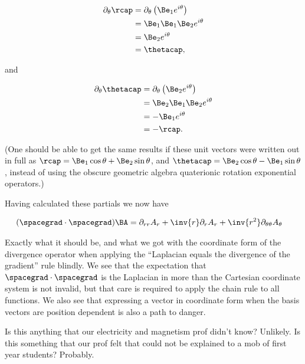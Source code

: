 \begin{align*}
\partial_\theta \rcap 
&=
\partial_\theta \left( \Be_1 e^{i\theta} \right) \\
&=
\Be_1 \Be_1 \Be_2 e^{i\theta} \\
&=
\Be_2 e^{i\theta} \\
&=
\thetacap,
\end{align*}

and

\begin{align*}
\partial_\theta \thetacap 
&=
\partial_\theta \left( \Be_2 e^{i\theta} \right) \\
&=
\Be_2 \Be_1 \Be_2 e^{i\theta} \\
&=
-\Be_1 e^{i\theta} \\
&=
-\rcap.
\end{align*}

(One should be able to get the same results if these unit vectors were written out in full as $\rcap = \Be_1 \cos\theta + \Be_2 \sin\theta$, and $\thetacap = \Be_2 \cos\theta - \Be_1 \sin\theta$, instead of using the obscure geometric algebra quaterionic rotation exponential operators.)

Having calculated these partials we now have

\begin{align}\label{eqn:divGradCurLap:14}
(\spacegrad \cdot \spacegrad) \BA
&=
\partial_{rr} A_r
+\inv{r} \partial_r A_r
+\inv{r^2} \partial_{\theta\theta} A_\theta
\end{align}

Exactly what it should be, and what we got with the coordinate form of the divergence operator when applying the ``Laplacian equals the divergence of the gradient'' rule blindly.  We see that the expectation that $\spacegrad \cdot \spacegrad$ is the Laplacian in more than the Cartesian coordinate system is not invalid, but that care is required to apply the chain rule to all functions.  We also see that expressing a vector in coordinate form when the basis vectors are position dependent is also a path to danger.

Is this anything that our electricity and magnetism prof didn't know?  Unlikely.  Is this something that our prof felt that could not be explained to a mob of first year students?  Probably.

\EndArticle
